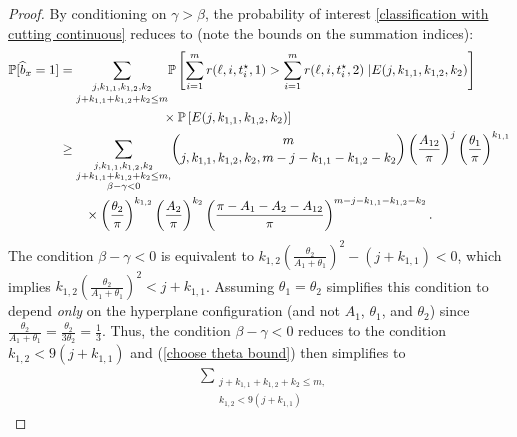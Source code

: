 \documentclass[twoside,11pt]{article}
\newcommand{\edit}[1]{{{#1}}}
\begin{document}
\begin{proof}
%
\edit{By conditioning on $\gamma>\beta$},  the probability of interest \eqref{classification with cutting continuous} reduces to (note the bounds on the summation indices):
\begin{align}
\mathbb{P}[\widehat{b}_x = 1] %
&= \underset{j+k_{1,1}+k_{1,2}+k_2\leq m}{\sum_{j,k_{1,1}, k_{1,2},k_2 } }%
\mathbb{P}\left[\sum_{i=1}^m r(\ell,i,t^\star_i,1) > \sum_{i=1}^m r(\ell,i,t^\star_i,2) \;| E( j,k_{1,1},k_{1,2},k_2 )
\right]\notag\\
&\qquad\qquad\qquad\qquad\times \mathbb{P}\left[%
E( j,k_{1,1},k_{1,2},k_2 )
\right]\\
%
&\geq  %
{\sum_{\substack{j,k_{1,1}, k_{1,2},k_2 \\ j+k_{1,1}+k_{1,2}+k_2\leq m, \\ \beta-\gamma<0} }}
 \binom{m}{j,k_{1,1},k_{1,2},k_2,m-j-k_{1,1}-k_{1,2}-k_2} \left(\frac{A_{12}}{\pi}\right)^j \left(\frac{\theta_1}{\pi} \right)^{k_{1,1}} \notag\\
&\quad\quad \times  \left(\frac{\theta_2}{\pi} \right)^{k_{1,2}} \left(\frac{A_2}{\pi} \right)^{k_2} \left(\frac{\pi-A_1-A_2-A_{12}}{\pi}\right)^{m-j-k_{1,1}-k_{1,2}-k_2}.\label{choose theta bound}
\end{align}
The condition $\beta-\gamma < 0$ is equivalent to $k_{1,2}(\frac{\theta_2}{A_1+\theta_1})^2 - ( j+k_{1,1}) < 0$, which implies $ k_{1,2}(\frac{\theta_2}{A_1+\theta_1})^2 < j+k_{1,1}$. Assuming $\theta_1=\theta_2$ simplifies this condition to depend \textit{only} on the hyperplane configuration (and not $A_1$, $\theta_1$, and $\theta_2$) since $\frac{\theta_2}{A_1+\theta_1} = \frac{\theta_2}{3\theta_2} = \frac{1}{3}$. Thus, the condition $\beta-\gamma <0$ reduces to the condition $k_{1,2} < 9(j+k_{1,1})$ 
and (\ref{choose theta bound}) then simplifies to
\begin{align}
&%
{\sum_{\substack{j+k_{1,1}+k_{1,2}+k_2\leq m, \\ k_{1,2} < 9(j+k_{1,1})}} %
}
\end{align}
\end{proof}
\end{document}
